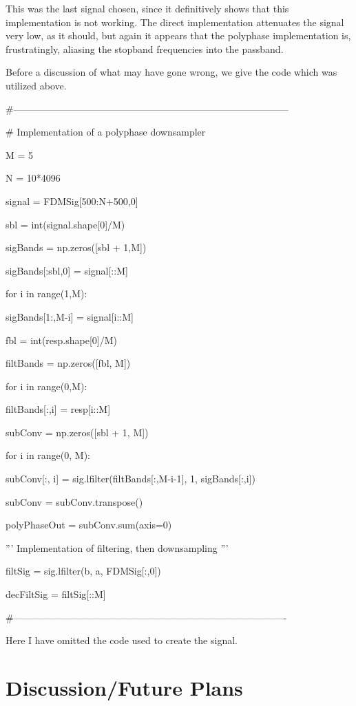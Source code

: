 \documentclass{report}
\begin{document}
This was the last signal chosen, since it definitively shows that this implementation is not working.  The direct implementation attenuates the signal very low, as it should, but again it appears that the polyphase implementation is, frustratingly, aliasing the stopband frequencies into the passband.

Before a discussion of what may have gone wrong, we give the code which was utilized above.

\#--------------------------------------------------------------------------------------

\# Implementation of a polyphase downsampler

M = 5

N = 10*4096

signal = FDMSig[500:N+500,0] 

sbl = int(signal.shape[0]/M)

sigBands = np.zeros([sbl + 1,M])

sigBands[:sbl,0] = signal[::M]

for i in range(1,M):

    sigBands[1:,M-i] = signal[i::M]


fbl = int(resp.shape[0]/M)

filtBands = np.zeros([fbl, M])

for i in range(0,M):

    filtBands[:,i] = resp[i::M]

    
subConv = np.zeros([sbl + 1, M])

for i in range(0, M):

    subConv[:, i] = sig.lfilter(filtBands[:,M-i-1], 1, sigBands[:,i])


subConv = subConv.transpose()

polyPhaseOut = subConv.sum(axis=0)

'''
Implementation of filtering, then downsampling
'''

filtSig = sig.lfilter(b, a, FDMSig[:,0])

decFiltSig = filtSig[::M]

\#-------------------------------------------------------------------------------------

Here I have omitted the code used to create the signal.

\section{Discussion/Future Plans}
\end{document}
